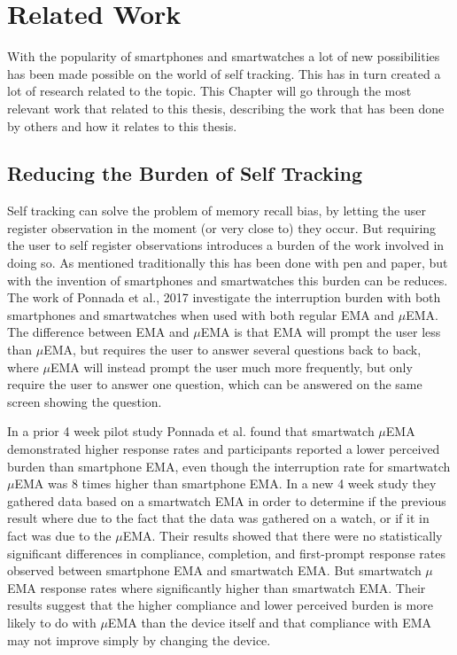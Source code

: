 \chapter{Related Work}\label{related_ch}
With the popularity of smartphones and smartwatches a lot of new possibilities has been made possible on the world of self tracking. This has in turn created a lot of research related to the topic. This Chapter will go through the most relevant work that related to this thesis, describing the work that has been done by others and how it relates to this thesis.


\section{Reducing the Burden of Self Tracking}
Self tracking can solve the problem of memory recall bias, by letting the user register observation in the moment (or very close to) they occur. But requiring the user to self register observations introduces a burden of the work involved in doing so. As mentioned traditionally this has been done with pen and paper, but with the invention of smartphones and smartwatches this burden can be reduces. The work of Ponnada et al., 2017\cite{compare} investigate the interruption burden with both smartphones and smartwatches when used with both regular EMA and $\mu$EMA. The difference between EMA and $\mu$EMA is that EMA will prompt the user less than $\mu$EMA, but requires the user to answer several questions back to back, where $\mu$EMA will instead prompt the user much more frequently, but only require the user to answer one question, which can be answered on the same screen showing the question. 

In a prior 4 week pilot study Ponnada et al.\cite{compare} found that smartwatch $\mu$EMA demonstrated higher response rates and participants reported a lower perceived burden than smartphone EMA, even though the interruption rate for smartwatch $\mu$EMA was 8 times higher than smartphone EMA. In a new 4 week study they gathered data based on a smartwatch EMA in order to determine if the previous result where due to the fact that the data was gathered on a watch, or if it in fact was due to the $\mu$EMA. Their results showed that there were no statistically significant differences in compliance, completion, and first-prompt response rates observed between smartphone EMA and smartwatch EMA. But smartwatch $\mu$EMA response rates where significantly higher than smartwatch EMA. Their results suggest that the higher compliance and lower perceived burden is more likely to do with $\mu$EMA than the device itself and that compliance with EMA may not improve simply by changing the device.

